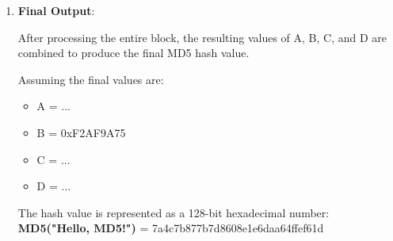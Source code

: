 \documentclass{report}
\begin{document}
{\begin{enumerate}[label=\textbf{Step \arabic*}:]
		\begin{itemize}
			\item Round 1:
			\begin{itemize}
				\item Function $F(B, C, D) = (B \& C) | (\neg B \& D)$
				\item Let's assume the current block's data is the padded message we calculated earlier.
				\item Temp = D = 0x10325476
				\item D = C = 0x98BADCFE
				\item C = B = 0xEFCDAB89
				\item Let's calculate $F(B, C, D)$:
				\item $F(B, C, D) = (0xEFCDAB89 \& 0x98BADCFE) | (\neg 0xEFCDAB89 \& 0x10325476) = 0x98BC9D7E$
				\item Let's assume the constant value for this round: Constant = 0x5A827999
				\item Let's assume the shift amount for this round: ShiftAmount = 7
				\item Calculate the new value of B:
				\item $B = B + \text{LeftRotate}((A + F(B, C, D) + \text{Data} + \text{Constant}), \text{ShiftAmount})$
				\item $B = 0xEFCDAB89 + \text{LeftRotate}((0x67452301 + 0x98BC9D7E + \text{Data} + 0x5A827999), 7)$
				\item $B = 0xEFCDAB89 + 0x03B9AC4C$
				\item $B = 0xF2AF9A75$
			\end{itemize}
		\end{itemize}
		
		\item \textbf{Final Output}:
		
		After processing the entire block, the resulting values of A, B, C, and D are combined to produce the final MD5 hash value.
		
		Assuming the final values are:
		\begin{itemize}
			\item A = ...
			\item B = 0xF2AF9A75
			\item C = ...
			\item D = ...
		\end{itemize}
		
		The hash value is represented as a 128-bit hexadecimal number:
		\textbf{MD5("Hello, MD5!")} = 7a4c7b877b7d8608e1e6daa64ffef61d
		
\end{enumerate}}
\end{document}
